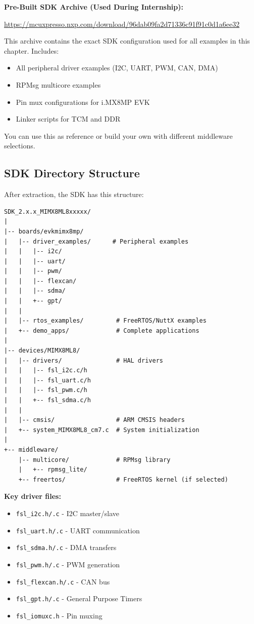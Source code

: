 \documentclass[12pt,a4paper]{report}
\begin{document}
\begin{gitref}
\textbf{Pre-Built SDK Archive (Used During Internship):}

\url{https://mcuxpresso.nxp.com/download/96dab09fa2d71336c91f91c0d1a6ee32}

This archive contains the exact SDK configuration used for all examples in this chapter. Includes:
\begin{itemize}
    \item All peripheral driver examples (I2C, UART, PWM, CAN, DMA)
    \item RPMsg multicore examples
    \item Pin mux configurations for i.MX8MP EVK
    \item Linker scripts for TCM and DDR
\end{itemize}

You can use this as reference or build your own with different middleware selections.
\end{gitref}

\subsection{SDK Directory Structure}

After extraction, the SDK has this structure:

\begin{verbatim}
SDK_2.x.x_MIMX8ML8xxxxx/
|
|-- boards/evkmimx8mp/
|   |-- driver_examples/      # Peripheral examples
|   |   |-- i2c/
|   |   |-- uart/
|   |   |-- pwm/
|   |   |-- flexcan/
|   |   |-- sdma/
|   |   +-- gpt/
|   |
|   |-- rtos_examples/         # FreeRTOS/NuttX examples
|   +-- demo_apps/             # Complete applications
|
|-- devices/MIMX8ML8/
|   |-- drivers/               # HAL drivers
|   |   |-- fsl_i2c.c/h
|   |   |-- fsl_uart.c/h
|   |   |-- fsl_pwm.c/h
|   |   +-- fsl_sdma.c/h
|   |
|   |-- cmsis/                 # ARM CMSIS headers
|   +-- system_MIMX8ML8_cm7.c  # System initialization
|
+-- middleware/
    |-- multicore/             # RPMsg library
    |   +-- rpmsg_lite/
    +-- freertos/              # FreeRTOS kernel (if selected)
\end{verbatim}

\textbf{Key driver files:}
\begin{itemize}
    \item \texttt{fsl\_i2c.h/.c} - I2C master/slave
    \item \texttt{fsl\_uart.h/.c} - UART communication
    \item \texttt{fsl\_sdma.h/.c} - DMA transfers
    \item \texttt{fsl\_pwm.h/.c} - PWM generation
    \item \texttt{fsl\_flexcan.h/.c} - CAN bus
    \item \texttt{fsl\_gpt.h/.c} - General Purpose Timers
    \item \texttt{fsl\_iomuxc.h} - Pin muxing
\end{itemize}
\end{document}
